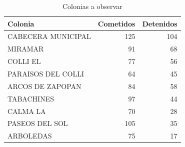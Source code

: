\begin{table}[ht]
\centering
\caption{Colonias a observar} 
\begin{tabular}{lrr}
  \hline
Colonia & Cometidos & Detenidos \\ 
  \hline
CABECERA MUNICIPAL & 125 & 104 \\ 
  MIRAMAR &  91 &  68 \\ 
  COLLI EL &  77 &  56 \\ 
  PARAISOS DEL COLLI &  64 &  45 \\ 
  ARCOS DE ZAPOPAN &  84 &  58 \\ 
  TABACHINES &  97 &  44 \\ 
  CALMA LA &  70 &  28 \\ 
  PASEOS DEL SOL & 105 &  35 \\ 
  ARBOLEDAS &  75 &  17 \\ 
   \hline
\end{tabular}

\end{table}


